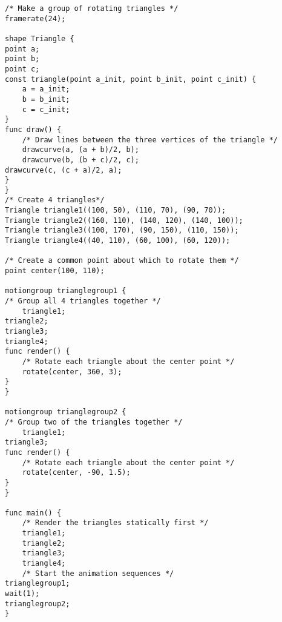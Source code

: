 \documentclass[letterpaper,12pt]{article}
\begin{document}
\begin{lstlisting}
/* Make a group of rotating triangles */
framerate(24);

shape Triangle {
point a;
point b;
point c;
const triangle(point a_init, point b_init, point c_init) {
    a = a_init;
    b = b_init;
    c = c_init;
}
func draw() {
    /* Draw lines between the three vertices of the triangle */
    drawcurve(a, (a + b)/2, b);
    drawcurve(b, (b + c)/2, c);
drawcurve(c, (c + a)/2, a);
}
}
/* Create 4 triangles*/
Triangle triangle1((100, 50), (110, 70), (90, 70));
Triangle triangle2((160, 110), (140, 120), (140, 100));
Triangle triangle3((100, 170), (90, 150), (110, 150));
Triangle triangle4((40, 110), (60, 100), (60, 120));

/* Create a common point about which to rotate them */
point center(100, 110);

motiongroup trianglegroup1 {
/* Group all 4 triangles together */
    triangle1;
triangle2;
triangle3;
triangle4;
func render() {
    /* Rotate each triangle about the center point */
    rotate(center, 360, 3);
}
}

motiongroup trianglegroup2 {
/* Group two of the triangles together */
    triangle1;
triangle3;
func render() {
    /* Rotate each triangle about the center point */
    rotate(center, -90, 1.5);
}
}

func main() {
    /* Render the triangles statically first */
    triangle1;
    triangle2;
    triangle3;
    triangle4;
    /* Start the animation sequences */
trianglegroup1;
wait(1);
trianglegroup2;
}
\end{lstlisting}
\end{document}
